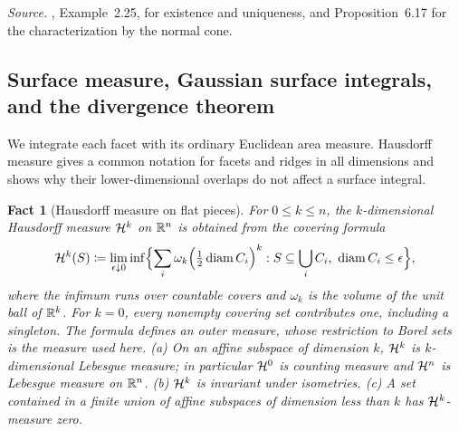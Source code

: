\documentclass[11pt,letterpaper]{article}
\theoremstyle{plain}
\newtheorem{fact}{Fact}[section]
\begin{document}
\emph{Source.} , Example~2.25, for existence and uniqueness,
and Proposition~6.17 for the characterization by the normal cone.

\subsection{Surface measure, Gaussian surface integrals, and the
divergence theorem}\label{tb:sec:surface}

We integrate each facet with its ordinary Euclidean area measure.
Hausdorff measure gives a common notation for facets and ridges in
all dimensions and shows why their lower-dimensional overlaps do not
affect a surface integral.

\begin{fact}[Hausdorff measure on flat pieces]\label{tb:hausdorff}
For \(0\le k\le n\), the \(k\)-dimensional Hausdorff measure \(\mathcal H^k\) on
\(\mathbb R^n\) is obtained from the covering formula
\[
 \mathcal H^k(S)\coloneqq \lim_{\epsilon\downarrow0}\inf\Bigl\{\sum_i\omega_k
 \Bigl(\tfrac12\operatorname{diam}C_i\Bigr)^k:S\subseteq\bigcup_iC_i,\
 \operatorname{diam}C_i\le\epsilon\Bigr\},
\]
where the infimum runs over countable covers and \(\omega_k\) is
the volume of the unit ball of \(\mathbb R^k\).
For \(k=0\), every nonempty covering set contributes one, including
a singleton. The formula defines an outer measure, whose restriction
to Borel sets is the measure used here. (a) On an
affine subspace of dimension \(k\), \(\mathcal H^k\) is \(k\)-dimensional Lebesgue
measure; in particular \(\mathcal H^0\) is counting measure and \(\mathcal H^n\) is
Lebesgue measure on \(\mathbb R^n\). (b) \(\mathcal H^k\) is invariant under isometries.
(c) A set contained in a finite union of affine subspaces of dimension less
than \(k\) has \(\mathcal H^k\)-measure zero.
\end{fact}
\end{document}
